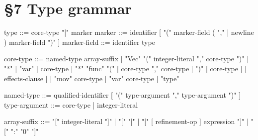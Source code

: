 \section*{§7 Type grammar}
\label{gram:type}
\begin{grammar}
type             ::= core-type { "|" marker }       %
marker           ::= identifier
                     [ "(" marker-field { ( "," | newline ) marker-field } ")" ]
marker-field     ::= identifier type

core-type        ::=
    named-type { array-suffix }
  | "Vec" "(" integer-literal "," core-type ")"     %
  | "*" [ "var" ] core-type                         %
  | "*" "func" "(" [ core-type { "," core-type } ] ")" [ core-type ]
    [ effects-clause ]                              %
  | "mov" core-type                                 %
  | "var" core-type                                 %
  | "type"                                          %


named-type       ::= qualified-identifier
                     [ "(" type-argument { "," type-argument } ")" ]
type-argument    ::= core-type | integer-literal

\end{grammar}

\label{gram:array-type}
\begin{grammar}
array-suffix     ::=
    "[" integer-literal "]"                         %
  | "[" "]"                                         %
  | "[" [ refinement-op ] expression "]"            %
  | "[" ":" "0" "]"                                %
\end{grammar}

